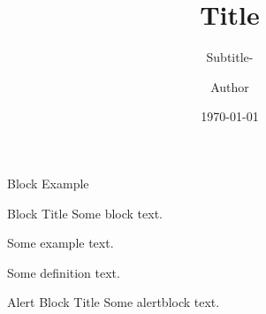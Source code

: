 \documentclass[10pt, xcolor={table}]{beamer}
\title{Title}             %
\subtitle{Subtitle}   %
\author{Author}       %
\date{\today}
\subtitle{\courseID - \courseName}
\author{\professor}
\date{\term}
\begin{document}
\maketitle

\begin{frame}{Block Example}
    \begin{block}{Block Title}
    Some block text. 
    \end{block}
    \begin{example}
    Some example text. 
    \end{example}
    \begin{definition}
    Some definition text. 
    \end{definition}
    \begin{alertblock}{Alert Block Title}
    Some alertblock text. 
    \end{alertblock}
\end{frame}
\end{document}
